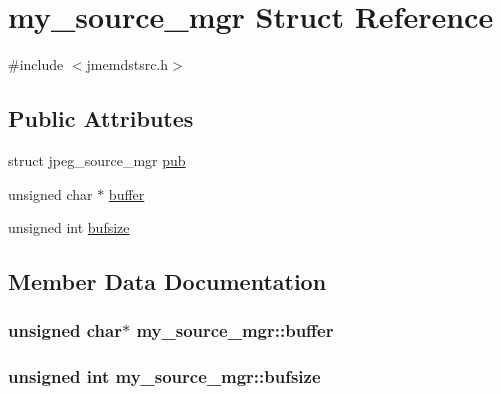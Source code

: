 \hypertarget{structmy__source__mgr}{}\section{my\+\_\+source\+\_\+mgr Struct Reference}
\label{structmy__source__mgr}


{\ttfamily \#include $<$jmemdstsrc.\+h$>$}

\subsection*{Public Attributes}
\begin{DoxyCompactItemize}
\item 
struct jpeg\+\_\+source\+\_\+mgr \hyperlink{structmy__source__mgr_a8572f33f87bec948592001edea12680f}{pub}
\item 
unsigned char $\ast$ \hyperlink{structmy__source__mgr_adfba5f559d5fc2ca926a6b2e67be0d9a}{buffer}
\item 
unsigned int \hyperlink{structmy__source__mgr_a379a5c8ab3b4ac9c1c08c27ec48980d0}{bufsize}
\end{DoxyCompactItemize}


\subsection{Member Data Documentation}
\subsubsection[{\texorpdfstring{buffer}{buffer}}]{\setlength{\rightskip}{0pt plus 5cm}unsigned char$\ast$ my\+\_\+source\+\_\+mgr\+::buffer}\hypertarget{structmy__source__mgr_adfba5f559d5fc2ca926a6b2e67be0d9a}{}\label{structmy__source__mgr_adfba5f559d5fc2ca926a6b2e67be0d9a}
\subsubsection[{\texorpdfstring{bufsize}{bufsize}}]{\setlength{\rightskip}{0pt plus 5cm}unsigned int my\+\_\+source\+\_\+mgr\+::bufsize}\hypertarget{structmy__source__mgr_a379a5c8ab3b4ac9c1c08c27ec48980d0}{}\label{structmy__source__mgr_a379a5c8ab3b4ac9c1c08c27ec48980d0}
